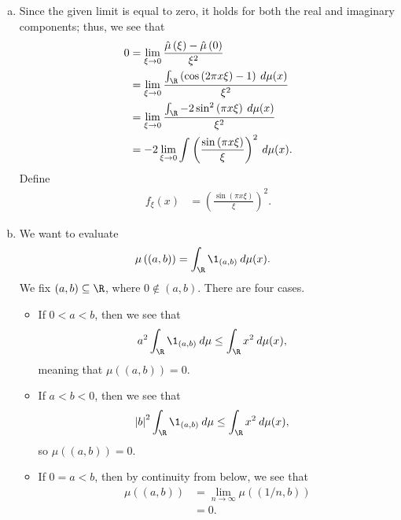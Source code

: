 \documentclass[10pt]{mypackage}
\begin{document}
\begin{enumerate}[(a)]
  \item Since the given limit is equal to zero, it holds for both the real and imaginary components; thus, we see that
    \begin{align*}
      0 &= \lim_{\xi\rightarrow 0} \frac{\hat{\mu}\left( \xi \right) - \hat{\mu}\left( 0 \right)}{\xi^2}\\
        &= \lim_{\xi\rightarrow 0} \frac{ \int_{\R}^{} \left( \cos\left( 2\pi x \xi \right) - 1 \right)\:d\mu(x) }{\xi^2}\\
        &= \lim_{\xi\rightarrow 0} \frac{ \int_{\R}^{} -2\sin^2\left( \pi x \xi \right)\:d\mu(x) }{ \xi^2 }\\
        &= -2 \lim_{\xi\rightarrow 0} \int_{}^{} \left( \frac{\sin\left( \pi x\xi \right)}{\xi} \right)^2\:d\mu(x).
    \end{align*}
    Define
    \begin{align*}
      f_{\xi}\left( x \right) &= \left( \frac{\sin\left( \pi x \xi \right)}{\xi} \right)^2.
    \end{align*}
  \item We want to evaluate
    \begin{align*}
      \mu\left( (a,b) \right) &= \int_{\R}^{} \1_{(a,b)}\:d\mu(x).
    \end{align*}
    We fix $(a,b)\subseteq \R$, where $0\notin (a,b)$. There are four cases.
    \begin{itemize}
      \item If $0 < a < b$, then we see that
        \begin{align*}
          a^2 \int_{\R}^{} \1_{(a,b)}\:d\mu &\leq \int_{\R}^{} x^2\:d\mu(x),
        \end{align*}
        meaning that $\mu\left( (a,b) \right) = 0$.
      \item If $a < b < 0$, then we see that
        \begin{align*}
          \left\vert b \right\vert^2 \int_{\R}^{} \1_{(a,b)}\:d\mu &\leq \int_{\R}^{} x^2\:d\mu(x),
        \end{align*}
        so $\mu\left( \left( a,b \right) \right) = 0$.
      \item If $0 = a < b$, then by continuity from below, we see that
        \begin{align*}
          \mu\left( \left( a,b \right) \right) &= \lim_{n\rightarrow\infty} \mu\left( (1/n,b) \right)\\
                                               &= 0.
        \end{align*}

\end{itemize}
\end{enumerate}
\end{document}
